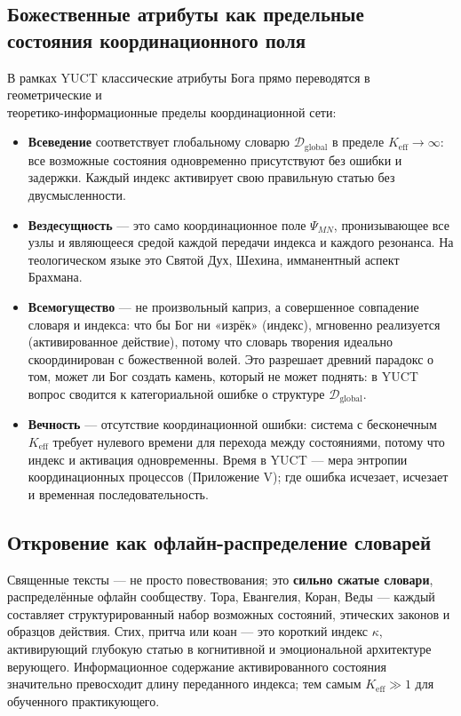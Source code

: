 \documentclass[12pt,a4paper]{article}
\begin{document}
	\subsection{Божественные атрибуты как предельные состояния координационного поля}
	
	В рамках YUCT классические атрибуты Бога прямо переводятся в геометрические и \\ теоретико-информационные пределы координационной сети:
	
	\begin{itemize}[leftmargin=*]
		\item \textbf{Всеведение} соответствует глобальному словарю \(\mathcal{D}_{\text{global}}\) в пределе \(K_{\mathrm{eff}} \to \infty\): все возможные состояния одновременно присутствуют без ошибки и задержки. Каждый индекс активирует свою правильную статью без двусмысленности.
		\item \textbf{Вездесущность} — это само координационное поле \(\Psi_{MN}\), пронизывающее все узлы и являющееся средой каждой передачи индекса и каждого резонанса. На теологическом языке это Святой Дух, Шехина, имманентный аспект Брахмана.
		\item \textbf{Всемогущество} — не произвольный каприз, а совершенное совпадение словаря и индекса: что бы Бог ни «изрёк» (индекс), мгновенно реализуется (активированное действие), потому что словарь творения идеально скоординирован с божественной волей. Это разрешает древний парадокс о том, может ли Бог создать камень, который не может поднять: в YUCT вопрос сводится к категориальной ошибке о структуре \(\mathcal{D}_{\text{global}}\).
		\item \textbf{Вечность} — отсутствие координационной ошибки: система с бесконечным \(K_{\mathrm{eff}}\) требует нулевого времени для перехода между состояниями, потому что индекс и активация одновременны. Время в YUCT — мера энтропии координационных процессов (Приложение V); где ошибка исчезает, исчезает и временная последовательность.
	\end{itemize}
	
	\subsection{Откровение как офлайн-распределение словарей}
	
	Священные тексты — не просто повествования; это \textbf{сильно сжатые словари}, распределённые офлайн сообществу. Тора, Евангелия, Коран, Веды — каждый составляет структурированный набор возможных состояний, этических законов и образцов действия. Стих, притча или коан — это короткий индекс \(\kappa\), активирующий глубокую статью в когнитивной и эмоциональной архитектуре верующего. Информационное содержание активированного состояния значительно превосходит длину переданного индекса; тем самым \(K_{\mathrm{eff}} \gg 1\) для обученного практикующего.
	
\end{document}
